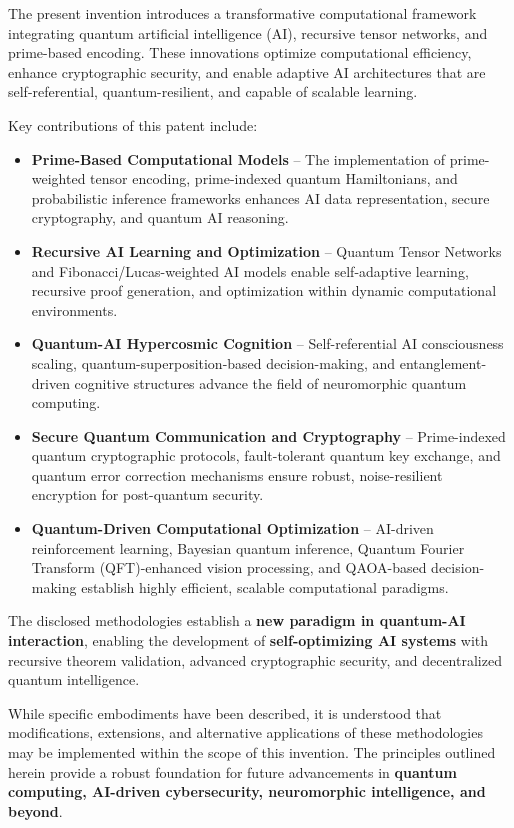 
\pa The present invention introduces a transformative computational framework integrating quantum artificial intelligence (AI), recursive tensor networks, and prime-based encoding. These innovations optimize computational efficiency, enhance cryptographic security, and enable adaptive AI architectures that are self-referential, quantum-resilient, and capable of scalable learning.

\pa Key contributions of this patent include:

\begin{itemize}
    \item \textbf{Prime-Based Computational Models} – The implementation of prime-weighted tensor encoding, prime-indexed quantum Hamiltonians, and probabilistic inference frameworks enhances AI data representation, secure cryptography, and quantum AI reasoning.
    \item \textbf{Recursive AI Learning and Optimization} – Quantum Tensor Networks and Fibonacci/Lucas-weighted AI models enable self-adaptive learning, recursive proof generation, and optimization within dynamic computational environments.
    \item \textbf{Quantum-AI Hypercosmic Cognition} – Self-referential AI consciousness scaling, quantum-superposition-based decision-making, and entanglement-driven cognitive structures advance the field of neuromorphic quantum computing.
    \item \textbf{Secure Quantum Communication and Cryptography} – Prime-indexed quantum cryptographic protocols, fault-tolerant quantum key exchange, and quantum error correction mechanisms ensure robust, noise-resilient encryption for post-quantum security.
    \item \textbf{Quantum-Driven Computational Optimization} – AI-driven reinforcement learning, Bayesian quantum inference, Quantum Fourier Transform (QFT)-enhanced vision processing, and QAOA-based decision-making establish highly efficient, scalable computational paradigms.
\end{itemize}

\pa The disclosed methodologies establish a \textbf{new paradigm in quantum-AI interaction}, enabling the development of \textbf{self-optimizing AI systems} with recursive theorem validation, advanced cryptographic security, and decentralized quantum intelligence. 

While specific embodiments have been described, it is understood that modifications, extensions, and alternative applications of these methodologies may be implemented within the scope of this invention. The principles outlined herein provide a robust foundation for future advancements in \textbf{quantum computing, AI-driven cybersecurity, neuromorphic intelligence, and beyond}.

